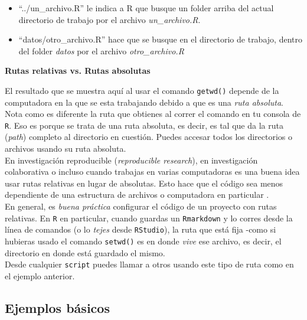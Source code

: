 \documentclass[]{article}
\begin{document}
\begin{itemize}
\itemsep1pt\parskip0pt
\item
  ``../un\_archivo.R'' le indica a R que busque un folder arriba del
  actual directorio de trabajo por el archivo \emph{un\_archivo.R}.
\item
  ``datos/otro\_archivo.R'' hace que se busque en el directorio de
  trabajo, dentro del folder \emph{datos} por el archivo
  \emph{otro\_archivo.R}
\end{itemize}

\begin{nota}
\textbf{Rutas relativas vs. Rutas absolutas\\}

El resultado que se muestra aquí al usar el comando \texttt{getwd()} depende de la computadora en la que se esta 
trabajando debido a que es una \textit{ruta absoluta}. Nota como es diferente la ruta 
que obtienes al correr el comando en tu consola de \texttt{R}. Eso es porque se trata 
de una ruta absoluta, es decir, es tal que da la ruta (\textit{path}) completo
al directorio en cuestión. Puedes accesar todos los directorios o archivos usando su ruta absoluta.\\

En investigación reproducible (\textit{reproducible research}), en investigación colaborativa o
incluso cuando trabajas en varias computadoras es una buena idea usar rutas relativas
en lugar de absolutas. Esto hace que el código sea menos dependiente de una estructura
de archivos o computadora en particular \parencite[][p. 67]{gandrud2013}. \\

En general, es \textit{buena práctica} configurar el código de un proyecto con rutas relativas.
En \texttt{R} en particular, cuando guardas un \texttt{Rmarkdown} y lo corres desde la línea de
comandos (o lo \textit{tejes} desde \texttt{RStudio}), la ruta que está fija -como si hubieras usado el comando \texttt{setwd()} es
en donde \textit{vive} ese archivo, es decir, el directorio en donde está guardado el mismo.\\

Desde cualquier \texttt{script} puedes llamar a otros usando este tipo de ruta como en 
el ejemplo anterior.
\end{nota}

\subsection{Ejemplos básicos}\label{ejemplos-basicos}
\end{document}
